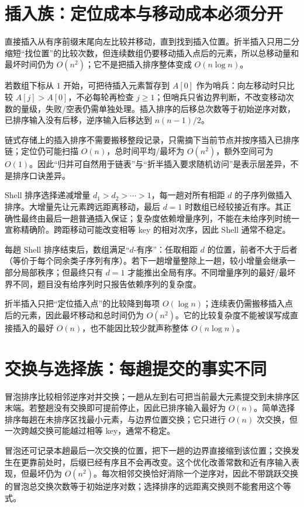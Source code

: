 \documentclass[UTF8,fontset=none,11pt,a4paper]{ctexart}
\begin{document}
\section{插入族：定位成本与移动成本必须分开}
直接插入从有序前缀末尾向左比较并移动，直到找到插入位置。折半插入只用二分缩短“找位置”的比较次数，但连续数组仍要移动插入点后的元素，所以总移动量和最坏时间仍为 $O(n^2)$；它不是把插入排序整体变成 $O(n\log n)$。

若数组下标从 $1$ 开始，可把待插入元素暂存到 $A[0]$ 作为哨兵：向左移动时只比较 $A[j]>A[0]$，不必每轮再检查 $j\ge1$；但哨兵只省边界判断，不改变移动次数的量级，失败/空表仍需单独处理。插入排序的后移总次数等于初始逆序对数，已排序输入没有后移，逆序输入后移达到 $n(n-1)/2$。

链式存储上的插入排序不需要搬移整段记录，只需摘下当前节点并按序插入已排序链；定位仍可能扫描 $O(n)$，总时间平均/最坏为 $O(n^2)$，额外空间可为 $O(1)$。因此“归并可自然用于链表”与“折半插入要求随机访问”是表示层差异，不是排序口诀差异。

Shell 排序选择递减增量 $d_1>d_2>\cdots>1$，每一趟对所有相距 $d$ 的子序列做插入排序。大增量先让元素跨远距离移动，最后 $d=1$ 时数组已经较接近有序。其正确性最终由最后一趟普通插入保证；复杂度依赖增量序列，不能在未给序列时统一宣称精确阶。跨距移动可能改变相等 key 的相对次序，因此 Shell 通常不稳定。

每趟 Shell 排序结束后，数组满足“$d$-有序”：任取相距 $d$ 的位置，前者不大于后者（等价于每个同余类子序列有序）。若下一趟增量整除上一趟，较小增量会继承一部分局部秩序；但最终只有 $d=1$ 才能推出全局有序。不同增量序列的最好/最坏界不同，题目没有给序列时只报告依赖序列的复杂度。

折半插入只把“定位插入点”的比较降到每项 $O(\log n)$；连续表仍需搬移插入点后的元素，因此最坏移动和总时间仍为 $O(n^2)$。它的比较复杂度不能被误写成直接插入的最好 $O(n)$，也不能因比较少就声称整体 $O(n\log n)$。

\section{交换与选择族：每趟提交的事实不同}
冒泡排序比较相邻逆序对并交换；一趟从左到右可把当前最大元素提交到未排序区末端。若整趟没有交换即可提前停止，因此已排序输入最好为 $O(n)$。简单选择排序每趟在未排序区找最小元素，与边界位置交换；它只进行 $O(n)$ 次交换，但一次跨越交换可能越过相等 key，通常不稳定。

冒泡还可记录本趟最后一次交换的位置，把下一趟的边界直接缩到该位置；交换发生在更靠前处时，后缀已经有序且不会再改变。这个优化改善常数和近有序输入表现，但最坏仍为 $O(n^2)$。每次相邻交换恰好消除一个逆序对，因此不带跳跃交换的冒泡总交换次数等于初始逆序对数；选择排序的远距离交换则不能套用这个等式。
\end{document}
